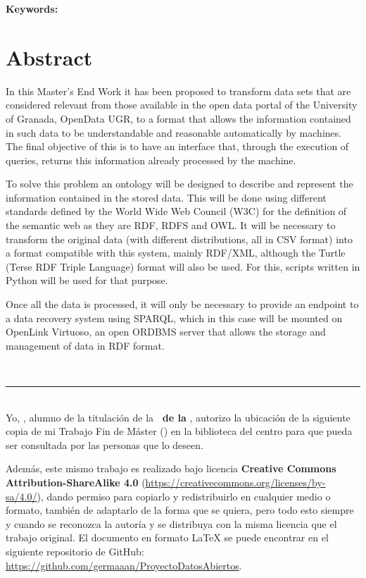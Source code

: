 \textbf{Keywords: }{\keywordsEn}


\section*{Abstract}

In this {\sf Master's End Work} it has been proposed to transform data sets that are considered relevant from those available in the open data portal of the {\sf University of Granada}, {\sf OpenData UGR}, to a format that allows the information contained in such data to be understandable and reasonable automatically by machines. The final objective of this is to have an interface that, through the execution of queries, returns this information already processed by the machine.
\bigskip

To solve this problem an ontology will be designed to describe and represent the information contained in the stored data. This will be done using different standards defined by the {\sf World Wide Web Council (W3C)} for the definition of the semantic web as they are {\sf RDF}, {\sf RDFS} and {\sf OWL}. It will be necessary to transform the original data (with different distributions, all in {\sf CSV} format) into a format compatible with this system, mainly {\sf RDF/XML}, although the {\sf Turtle (Terse RDF Triple Language)} format will also be used. For this, scripts written in {\sf Python} will be used for that purpose.

\bigskip
Once all the data is processed, it will only be necessary to provide an endpoint to a data recovery system using {\sf SPARQL}, which in this case will be mounted on {\sf OpenLink Virtuoso}, an open {\sf ORDBMS} server that allows the storage and management of data in {\sf RDF format}.

\newpage
\thispagestyle{empty}
\
\vspace{3cm}

\noindent\rule[-1ex]{\textwidth}{2pt}\\[4.5ex]

Yo, \textbf{\autor}, alumno de la titulación \textbf{\master} de la \textbf{\escuela\ de la \universidad}, autorizo la ubicación de la siguiente copia de mi Trabajo Fin de Máster (\textit{\titulo}) en la biblioteca del centro para que pueda ser consultada por las personas que lo deseen.

\bigskip
Además, este mismo trabajo es realizado bajo licencia \textbf{Creative Commons Attribution-ShareAlike 4.0} (\url{https://creativecommons.org/licenses/by-sa/4.0/}), dando permiso para copiarlo y redistribuirlo en cualquier medio o formato, también de adaptarlo de la forma que se quiera, pero todo esto siempre y cuando se reconozca la autoría y se distribuya con la misma licencia que el trabajo original. El documento en formato {\sf LaTeX} se puede encontrar en el siguiente repositorio de {\sf GitHub}: \url{https://github.com/germaaan/ProyectoDatosAbiertos}.


